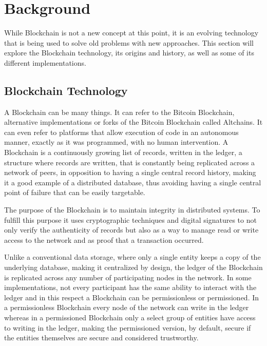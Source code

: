 \chapter{Background}

While Blockchain is not a new concept at this point, it is an evolving
technology that is being used to solve old problems with new approaches. This
section will explore the Blockchain technology, its origins and history, as
well as some of its different implementations. 

\section{Blockchain Technology}

  A Blockchain can be many things. It can refer to the Bitcoin Blockchain,
  alternative implementations or forks of the Bitcoin Blockchain called
  Altchains. \cite{Lewis2015} It can even refer to platforms that allow
  execution of code in an autonomous manner, exactly as it was programmed, with
  no human intervention.  A Blockchain is a continuously growing list of
  records, written in the ledger, a structure where records are written, that
  is constantly being replicated across a network of peers, in opposition to
  having a single central record history, making it a good example of a
  distributed database, thus avoiding having a single central point of failure
  that can be easily targetable. \cite{Barclay2017}

  The purpose of the Blockchain is to maintain integrity in distributed
  systems. \cite{Drescher2017} To fulfill this purpose it uses cryptographic
  techniques and digital signatures to not only verify the authenticity of
  records but also as a way to manage read or write access to the network and
  as proof that a transaction occurred.

  Unlike a conventional data storage, where only a single entity keeps a copy
  of the underlying database, making it centralized by design, the ledger of
  the Blockchain is replicated across any number of participating nodes in the
  network.\cite{Lewis2015} In some implementations, not every participant has
  the same ability to interact with the ledger and in this respect a Blockchain
  can be permissionless or permissioned. In a permissionless Blockchain every
  node of the network can write in the ledger whereas in a permissioned
  Blockchain only a select group of entities have access to writing in the
  ledger, making the permissioned version, by default, secure if the entities
  themselves are secure and considered trustworthy.
  \cite{Lewis2015,Valenta2017}

